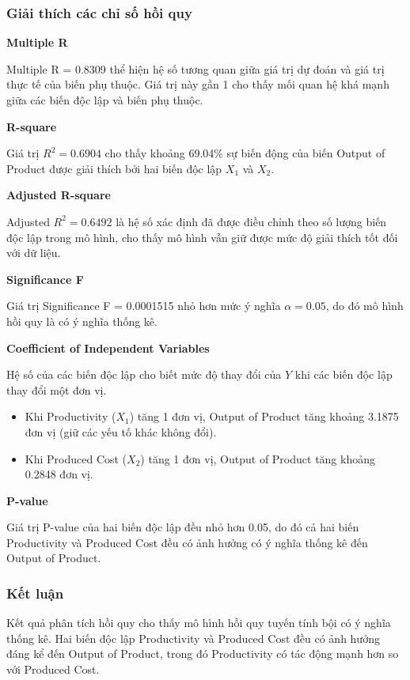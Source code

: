 \subsubsection*{Giải thích các chỉ số hồi quy}

\textbf{Multiple R}

Multiple R = 0.8309 thể hiện hệ số tương quan giữa giá trị dự đoán và
giá trị thực tế của biến phụ thuộc. Giá trị này gần 1 cho thấy mối quan hệ
khá mạnh giữa các biến độc lập và biến phụ thuộc.

\textbf{R-square}

Giá trị $R^2 = 0.6904$ cho thấy khoảng 69.04\% sự biến động của biến
Output of Product được giải thích bởi hai biến độc lập $X_1$ và $X_2$.

\textbf{Adjusted R-square}

Adjusted $R^2 = 0.6492$ là hệ số xác định đã được điều chỉnh theo số lượng
biến độc lập trong mô hình, cho thấy mô hình vẫn giữ được mức độ giải thích
tốt đối với dữ liệu.

\textbf{Significance F}

Giá trị Significance F = 0.0001515 nhỏ hơn mức ý nghĩa $\alpha = 0.05$,
do đó mô hình hồi quy là có ý nghĩa thống kê.

\textbf{Coefficient of Independent Variables}

Hệ số của các biến độc lập cho biết mức độ thay đổi của $Y$
khi các biến độc lập thay đổi một đơn vị.

\begin{itemize}
\item Khi Productivity ($X_1$) tăng 1 đơn vị, Output of Product tăng
khoảng 3.1875 đơn vị (giữ các yếu tố khác không đổi).
\item Khi Produced Cost ($X_2$) tăng 1 đơn vị, Output of Product tăng
khoảng 0.2848 đơn vị.
\end{itemize}

\textbf{P-value}

Giá trị P-value của hai biến độc lập đều nhỏ hơn 0.05,
do đó cả hai biến Productivity và Produced Cost đều có ảnh hưởng
có ý nghĩa thống kê đến Output of Product.

\subsubsection*{Kết luận}

Kết quả phân tích hồi quy cho thấy mô hình hồi quy tuyến tính bội
có ý nghĩa thống kê. Hai biến độc lập Productivity và Produced Cost
đều có ảnh hưởng đáng kể đến Output of Product, trong đó
Productivity có tác động mạnh hơn so với Produced Cost.

